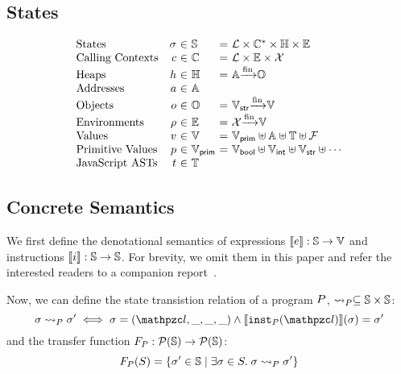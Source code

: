 \subsection{States}
\[
  \begin{array}{lr@{~}c@{~}l@{~}c@{~}l}
    \text{States} & \st &\in& \stset &=&
    \labset \times \ctxtset^* \times \heapset \times \envset\\

    \text{Calling Contexts} & \ctxt &\in& \ctxtset &=&
    \labset \times \envset \times \varset\\

    \text{Heaps} & \heap &\in& \heapset &=&
    \addrset \finmap \objset\\
    
    \text{Addresses} & \addr &\in& \addrset\\

    \text{Objects} & \obj &\in& \objset &=&
    \strset \finmap \valset\\

    \text{Environments} & \env &\in& \envset &=&
    \varset \finmap \valset\\

    \text{Values} & \val &\in& \valset &=&
    \pvalset \uplus \addrset \uplus \treeset \uplus \funcset\\

    \text{Primitive Values} & \pval &\in& \pvalset &=&
    \boolset \uplus \intset \uplus \strset \uplus \cdots\\

    \text{JavaScript ASTs} & \tree &\in& \treeset\\
  \end{array}
\]

\subsection{Concrete Semantics}
We first define the denotational semantics of expressions
$\llbracket{e}\rrbracket: \mathbb{S} \rightarrow \mathbb{V}$
and instructions
$\llbracket{i}\rrbracket: \mathbb{S} \rightarrow \mathbb{S}$.
For brevity, we omit them 
in this paper and refer the interested readers to a
companion report~\cite{report}.

Now, we can define the state transistion relation
of a program $P$, $\leadsto_{P} \subseteq \mathbb{S} \times \mathbb{S}$:
\[
  \st \trans{\prog} \st' \iff
  \st = (\lab, \_, \_, \_) \wedge
  \sem{\getinst{\prog}(\lab)}(\st) = \st'
\]
and the transfer function $F_{P}: \mathcal{P}(\mathbb{S}) \rightarrow \mathcal{P}(\mathbb{S})$:
\[
  F_{P}(S) = \{ \sigma' \in \mathbb{S} \mid \exists \sigma \in S. \; \sigma \leadsto_{P} \sigma' \}
\]

